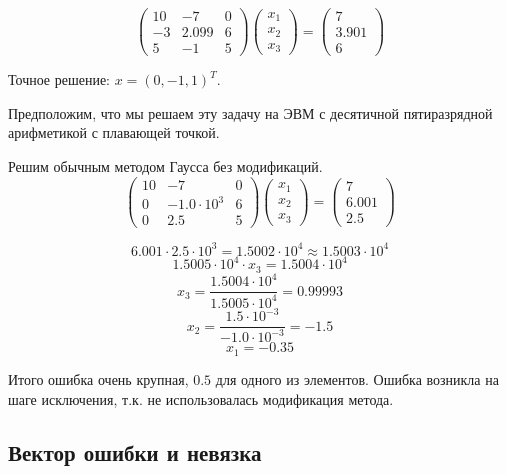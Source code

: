 \begin{example}
    \[\begin{pmatrix}
            10  & - 7   & 0 \\
            - 3 & 2.099 & 6 \\
            5   & - 1   & 5
        \end{pmatrix} \begin{pmatrix}
            x_1 \\ x_2 \\ x_3
        \end{pmatrix} = \begin{pmatrix}
            7 \\ 3.901 \\ 6
        \end{pmatrix} \]

    Точное решение: \(x = (0, - 1, 1)^T\).

    Предположим, что мы решаем эту задачу на ЭВМ с десятичной пятиразрядной арифметикой с плавающей точкой.

    Решим обычным методом Гаусса без модификаций.
    \[\begin{pmatrix}
            10 & - 7              & 0 \\
            0  & - 1.0 \cdot 10^3 & 6 \\
            0  & 2.5              & 5
        \end{pmatrix} \begin{pmatrix}
            x_1 \\ x_2 \\ x_3
        \end{pmatrix} = \begin{pmatrix}
            7 \\ 6.001 \\ 2.5 \end{pmatrix}\]

    \[
        6.001 \cdot 2.5  \cdot 10^3 = 1.5002 \cdot 10^4 \approx 1.5003 \cdot 10^4
    \]
    \[1.5005 \cdot 10^4 \cdot x_3 = 1.5004 \cdot 10^4\]
    \[x_3 = \frac{1.5004 \cdot 10^4}{1.5005 \cdot 10^4} = 0.99993\]
    \[x_2 = \frac{1.5 \cdot 10^{ - 3}}{ - 1.0 \cdot 10^{ - 3}} = - 1.5\]
    \[x_1 = - 0.35\]

    Итого ошибка очень крупная, \(0.5\) для одного из элементов. Ошибка возникла на шаге исключения, т.к. не использовалась модификация метода.
\end{example}

\subsection{Вектор ошибки и невязка}

